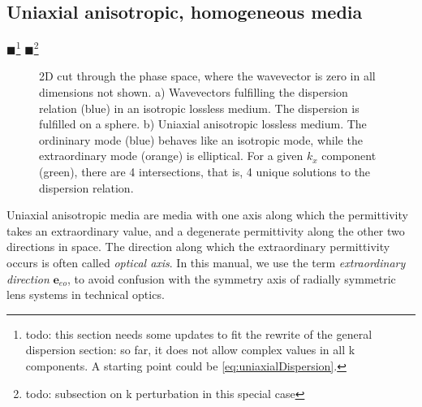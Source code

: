 \documentclass[12pt,a4paper,twoside,openright,BCOR10mm,headsepline,titlepage,abstracton,chapterprefix,final]{scrreprt}
\newcommand\Vector[1]{{\mathbf{#1}}}
\newcommand\wavenumber{k}
\newcommand{\remark}[1]{{\color{red}$\blacksquare$}\footnote{{\color{red}#1}}}
\begin{document}
\subsection{Uniaxial anisotropic, homogeneous media}
\remark{todo: this section needs some updates to fit the rewrite of the general dispersion section: so far, it does not allow complex values in all k components. A starting point could be \ref{eq:uniaxialDispersion}.}
\remark{todo: subsection on k perturbation in this special case}
\begin{figure}
  \centering
  \caption{2D cut through the phase space,
           where the wavevector is zero in all dimensions not shown.
           a) Wavevectors fulfilling the dispersion relation (blue) in an isotropic lossless medium. The dispersion is fulfilled on a sphere.
           b) Uniaxial anisotropic lossless medium. 
              The ordininary mode (blue) behaves like an isotropic mode, 
              while the extraordinary mode (orange) is elliptical.
              For a given $\wavenumber_x$ component (green),
              there are 4 intersections, that is, 4 unique solutions to the dispersion relation.}
  \label{fig:disperion_isotropic_and_uniaxial}
\end{figure}
Uniaxial anisotropic media are media with one axis along which the permittivity takes an extraordinary value, 
and a degenerate permittivity along the other two directions in space.
The direction along which the extraordinary permittivity occurs is often called \emph{optical axis}. 
In this manual, we use the term \emph{extraordinary direction} $\Vector{e}_{eo}$, to avoid confusion with the symmetry axis of radially symmetric lens systems in technical optics.
\end{document}
